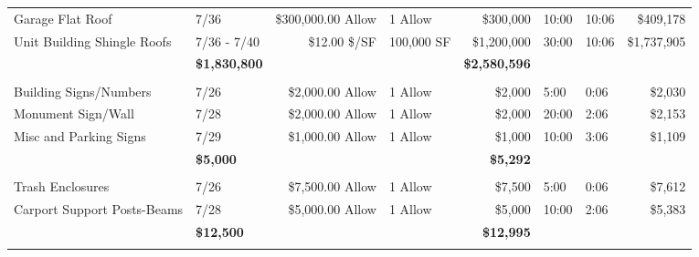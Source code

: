 \documentclass[11pt,letterpaper]{article}
\begin{document}
\begin{longtable}{p{5.1cm} p{1.6cm} r p{1.7cm} r p{1.0cm} p{1.2cm} r}
Garage Flat Roof & 7/36 & \$300,000.00 Allow & 1 Allow & \$300,000 & 10:00 & 10:06 & \$409,178 \\
\rowcolor{blue!12} Unit Building Shingle Roofs & 7/36 - 7/40 & \$12.00 \$/SF & 100,000 SF & \$1,200,000 & 30:00 & 10:06 & \$1,737,905 \\
\addlinespace[1pt] \multicolumn{4}{r}{} & \textbf{\$1,830,800} & & & \textbf{\$2,580,596} \\
\addlinespace[6pt]
\multicolumn{8}{l}{\textbf{Signage}} \\
\rowcolor{blue!12} Building Signs/Numbers & 7/26 & \$2,000.00 Allow & 1 Allow & \$2,000 & 5:00 & 0:06 & \$2,030 \\
Monument Sign/Wall & 7/28 & \$2,000.00 Allow & 1 Allow & \$2,000 & 20:00 & 2:06 & \$2,153 \\
\rowcolor{blue!12} Misc and Parking Signs & 7/29 & \$1,000.00 Allow & 1 Allow & \$1,000 & 10:00 & 3:06 & \$1,109 \\
\addlinespace[1pt] \multicolumn{4}{r}{} & \textbf{\$5,000} & & & \textbf{\$5,292} \\
\addlinespace[6pt]
\multicolumn{8}{l}{\textbf{Structural}} \\
\rowcolor{blue!12} Trash Enclosures & 7/26 & \$7,500.00 Allow & 1 Allow & \$7,500 & 5:00 & 0:06 & \$7,612 \\
Carport Support Posts-Beams & 7/28 & \$5,000.00 Allow & 1 Allow & \$5,000 & 10:00 & 2:06 & \$5,383 \\
\addlinespace[1pt] \multicolumn{4}{r}{} & \textbf{\$12,500} & & & \textbf{\$12,995} \\
\addlinespace[6pt]
\bottomrule
\end{longtable}
\end{document}
